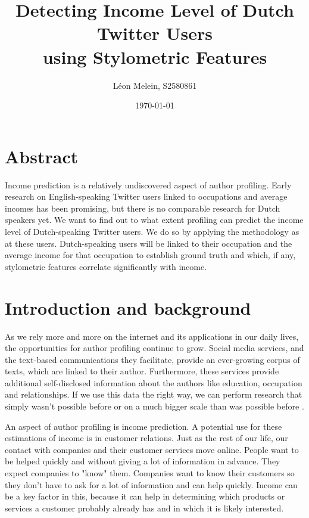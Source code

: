 \documentclass[11pt, a4paper]{article}
\begin{document}
\title{Detecting Income Level of Dutch Twitter Users\\using Stylometric Features}
\author{L\'eon Melein, S2580861}
\date{\today}
\maketitle
\section*{Abstract}
Income prediction is a relatively undiscovered aspect of author profiling. Early research on English-speaking Twitter users linked to occupations and average incomes has been promising, but there is no comparable research for Dutch speakers yet. We want to find out to what extent profiling can predict the income level of Dutch-speaking Twitter users. We do so by applying the methodology as \citet{flekova} at these users. Dutch-speaking users will be linked to their occupation and the average income for that occupation to establish ground truth and which, if any, stylometric features correlate significantly with income.

\newpage
\section{Introduction and background}
As we rely more and more on the internet and its applications in our daily lives, the opportunities for author profiling continue to grow. Social media services, and the text-based communications they facilitate, provide an ever-growing corpus of texts, which are linked to their author. Furthermore, these services provide additional self-disclosed information about the authors like education, occupation and relationships. If we use this data the right way, we can perform research that simply wasn't possible before or on a much bigger scale than was possible before \citep{sloan}.

An aspect of author profiling is income prediction. A potential use for these estimations of income is in customer relations. Just as the rest of our life, our contact with companies and their customer services move online. People want to be helped quickly and without giving a lot of information in advance. They expect companies to "know" them. Companies want to know their customers so they don't have to ask for a lot of information and can help quickly. Income can be a key factor in this, because it can help in determining which products or services a customer probably already has and in which it is likely interested.
\end{document}
